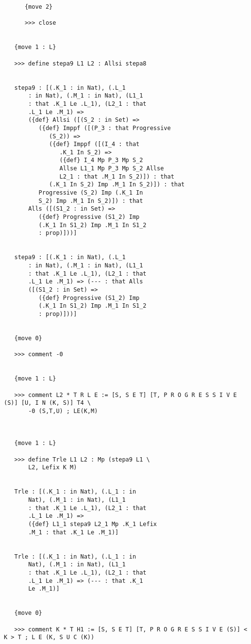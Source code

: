\documentclass{article}
\begin{document}
\begin{verbatim}
      {move 2}

      >>> close


   {move 1 : L}

   >>> define stepa9 L1 L2 : Allsi stepa8


   stepa9 : [(.K_1 : in Nat), (.L_1 
       : in Nat), (.M_1 : in Nat), (L1_1 
       : that .K_1 Le .L_1), (L2_1 : that 
       .L_1 Le .M_1) => 
       ({def} Allsi ([(S_2 : in Set) => 
          ({def} Imppf ([(P_3 : that Progressive 
             (S_2)) => 
             ({def} Imppf ([(I_4 : that 
                .K_1 In S_2) => 
                ({def} I_4 Mp P_3 Mp S_2 
                Allse L1_1 Mp P_3 Mp S_2 Allse 
                L2_1 : that .M_1 In S_2)]) : that 
             (.K_1 In S_2) Imp .M_1 In S_2)]) : that 
          Progressive (S_2) Imp (.K_1 In 
          S_2) Imp .M_1 In S_2)]) : that 
       Alls ([(S1_2 : in Set) => 
          ({def} Progressive (S1_2) Imp 
          (.K_1 In S1_2) Imp .M_1 In S1_2 
          : prop)]))]


   stepa9 : [(.K_1 : in Nat), (.L_1 
       : in Nat), (.M_1 : in Nat), (L1_1 
       : that .K_1 Le .L_1), (L2_1 : that 
       .L_1 Le .M_1) => (--- : that Alls 
       ([(S1_2 : in Set) => 
          ({def} Progressive (S1_2) Imp 
          (.K_1 In S1_2) Imp .M_1 In S1_2 
          : prop)]))]


   {move 0}

   >>> comment -0


   {move 1 : L}

   >>> comment L2 * T R L E := [S, S E T] [T, P R O G R E S S I V E (S)] [U, I N (K, S)] T4 \
       -0 (S,T,U) ; LE(K,M)



   {move 1 : L}

   >>> define Trle L1 L2 : Mp (stepa9 L1 \
       L2, Lefix K M)


   Trle : [(.K_1 : in Nat), (.L_1 : in 
       Nat), (.M_1 : in Nat), (L1_1 
       : that .K_1 Le .L_1), (L2_1 : that 
       .L_1 Le .M_1) => 
       ({def} L1_1 stepa9 L2_1 Mp .K_1 Lefix 
       .M_1 : that .K_1 Le .M_1)]


   Trle : [(.K_1 : in Nat), (.L_1 : in 
       Nat), (.M_1 : in Nat), (L1_1 
       : that .K_1 Le .L_1), (L2_1 : that 
       .L_1 Le .M_1) => (--- : that .K_1 
       Le .M_1)]


   {move 0}

   >>> comment K * T H1 := [S, S E T] [T, P R O G R E S S I V E (S)] < K > T ; L E (K, S U C (K))



\end{verbatim}
\end{document}
